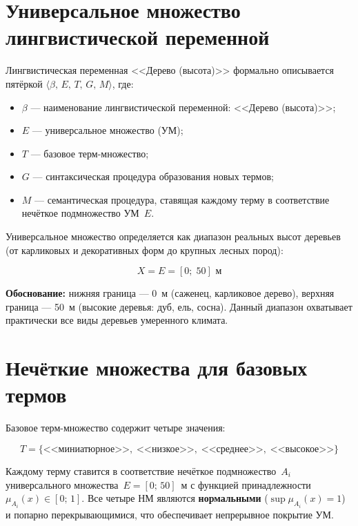 \documentclass[14pt,a4paper]{extarticle}
\begin{document}
\tableofcontents
\newpage

\section{Универсальное множество лингвистической переменной}

Лингвистическая переменная <<Дерево (высота)>> формально описывается
пятёркой $\langle \beta,\, E,\, T,\, G,\, M \rangle$, где:

\begin{itemize}
    \item $\beta$ --- наименование лингвистической переменной: <<Дерево (высота)>>;
    \item $E$ --- универсальное множество (УМ);
    \item $T$ --- базовое терм-множество;
    \item $G$ --- синтаксическая процедура образования новых термов;
    \item $M$ --- семантическая процедура, ставящая каждому терму в соответствие
    нечёткое подмножество УМ~$E$.
\end{itemize}

Универсальное множество определяется как диапазон реальных высот деревьев
(от карликовых и декоративных форм до крупных лесных пород):

\begin{equation}
    \boxed{X = E = [0;\;50] \text{ м}}
\end{equation}

\noindent
\textbf{Обоснование:} нижняя граница --- 0~м (саженец, карликовое дерево),
верхняя граница --- 50~м (высокие деревья: дуб, ель, сосна).
Данный диапазон охватывает практически все виды деревьев умеренного климата.

\section{Нечёткие множества для базовых термов}

Базовое терм-множество содержит четыре значения:

\begin{equation}
    T = \{\text{<<миниатюрное>>},\;\text{<<низкое>>},\;
          \text{<<среднее>>},\;\text{<<высокое>>}\}
\end{equation}

Каждому терму ставится в соответствие нечёткое подмножество~$A_i$
универсального множества~$E = [0;\,50]$~м с функцией принадлежности
$\mu_{A_i}(x) \in [0;\,1]$.
Все четыре НМ являются \textbf{нормальными} ($\sup \mu_{A_i}(x) = 1$)
и попарно перекрывающимися, что обеспечивает непрерывное покрытие УМ.
\end{document}
